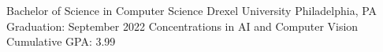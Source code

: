 

\begin{cventries}

  \cventry
    {Bachelor of Science in Computer Science} %
    {Drexel University} %
    {Philadelphia, PA} %
    {Graduation: September 2022} %
    {}
  \vspace*{-.4cm}\cventry
    {Concentrations in AI and Computer Vision}
    {}
    {}
    {Cumulative GPA: 3.99}
    {}

\end{cventries}
